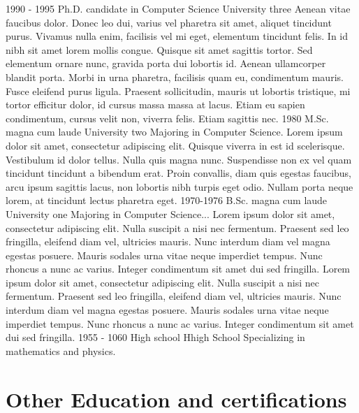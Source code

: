 \documentclass[letterpaper]{twentyonesecondcv} %
\begin{document}
{    \begin{twenty}
      \twentyitem
        {1990 - 1995}
        {Ph.D. {\normalfont candidate in Computer Science}}
        {University three}
        {Aenean vitae faucibus dolor. Donec leo dui, varius vel pharetra sit amet, aliquet tincidunt purus. Vivamus nulla enim, facilisis vel mi eget, elementum tincidunt felis. In id nibh sit amet lorem mollis congue. Quisque sit amet sagittis tortor. Sed elementum ornare nunc, gravida porta dui lobortis id. Aenean ullamcorper blandit porta. Morbi in urna pharetra, facilisis quam eu, condimentum mauris. Fusce eleifend purus ligula. Praesent sollicitudin, mauris ut lobortis tristique, mi tortor efficitur dolor, id cursus massa massa at lacus. Etiam eu sapien condimentum, cursus velit non, viverra felis. Etiam sagittis nec.}
      \twentyitem
        {1980}
        {M.Sc. magna cum laude}
        {University two}
        {Majoring in Computer Science. Lorem ipsum dolor sit amet, consectetur adipiscing elit. Quisque viverra in est id scelerisque. Vestibulum id dolor tellus. Nulla quis magna nunc. Suspendisse non ex vel quam tincidunt tincidunt a bibendum erat. Proin convallis, diam quis egestas faucibus, arcu ipsum sagittis lacus, non lobortis nibh turpis eget odio. Nullam porta neque lorem, at tincidunt lectus pharetra eget.}
      \twentyitem
        {1970-1976}
        {B.Sc. magna cum laude}
        {University one}
        {Majoring in Computer Science... Lorem ipsum dolor sit amet, consectetur adipiscing elit. Nulla suscipit a nisi nec fermentum. Praesent sed leo fringilla, eleifend diam vel, ultricies mauris. Nunc interdum diam vel magna egestas posuere. Mauris sodales urna vitae neque imperdiet tempus. Nunc rhoncus a nunc ac varius. Integer condimentum sit amet dui sed fringilla. Lorem ipsum dolor sit amet, consectetur adipiscing elit. Nulla suscipit a nisi nec fermentum. Praesent sed leo fringilla, eleifend diam vel, ultricies mauris. Nunc interdum diam vel magna egestas posuere. Mauris sodales urna vitae neque imperdiet tempus. Nunc rhoncus a nunc ac varius. Integer condimentum sit amet dui sed fringilla.}
      \twentyitem
        {1955 - 1060}
        {High school}
        {Hhigh School}
        {Specializing in mathematics and physics.}
    \end{twenty}
    
    \section{Other Education and certifications}
    
}
\end{document}
